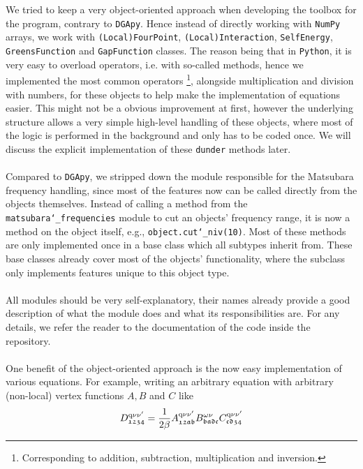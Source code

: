 \documentclass[../../main.tex]{subfiles}
\begin{document}
\\\\
We tried to keep a very object-oriented approach when developing the toolbox for the program, contrary to \texttt{DGApy}. Hence instead of directly working with \texttt{NumPy} arrays, we work with \texttt{(Local)FourPoint}, \texttt{(Local)Interaction}, \texttt{SelfEnergy}, \texttt{GreensFunction} and \texttt{GapFunction} classes. The reason being that in \texttt{Python}, it is very easy to overload operators, i.e. with so-called  methods, hence we implemented the most common operators \footnote{Corresponding to addition, subtraction, multiplication and inversion.}, alongside multiplication and division with numbers, for these objects to help make the implementation of equations easier. This might not be a obvious improvement at first, however the underlying structure allows a very simple high-level handling of these objects, where most of the logic is performed in the background and only has to be coded once. We will discuss the explicit implementation of these \texttt{dunder} methods later.
\\\\
Compared to \texttt{DGApy}, we stripped down the module responsible for the Matsubara frequency handling, since most of the features now can be called directly from the objects themselves. Instead of calling a method from the \texttt{matsubara\char`_frequencies} module to cut an objects' frequency range, it is now a method on the object itself, e.g., \texttt{object.cut\char`_niv(10)}. Most of these methods are only implemented once in a base class which all subtypes inherit from. These base classes already cover most of the objects' functionality, where the subclass only implements features unique to this object type.
\\\\
All modules should be very self-explanatory, their names already provide a good description of what the module does and what its responsibilities are. For any details, we refer the reader to the documentation of the code inside the repository.
\\\\
One benefit of the object-oriented approach is the now easy implementation of various equations. For example, writing an arbitrary equation with arbitrary (non-local) vertex functions $A,B$ and $C$ like
\begin{align}
	D^{\text{q}\nu\nu'}_{\mathfrak{1234}}=\frac{1}{2\beta}A^{\text{q}\nu\nu'}_{\mathfrak{12ab}}B^{\omega\nu}_{\mathfrak{badc}}C^{\text{q}\nu\nu'}_{\mathfrak{cd34}}
\end{align}
\end{document}
